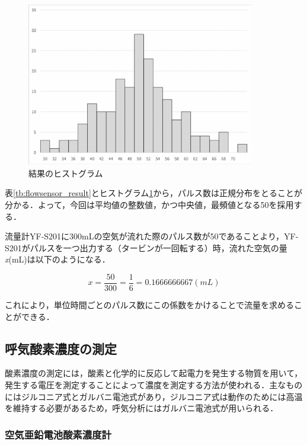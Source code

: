 \begin{figure}[H]
  \begin{center}
    \caption{結果のヒストグラム}
    \label{fig:flowsensor_histogram}
    \includegraphics[width=10cm]{fig/flowsensor_histogram}
  \end{center}
\end{figure}

表\ref{tb:flowsensor_result}とヒストグラム\ref{fig:flowsensor_histogram}から，パルス数は正規分布をとることが分かる．よって，今回は平均値の整数値，かつ中央値，最頻値となる50を採用する．

流量計YF-S201に300mLの空気が流れた際のパルス数が50であることより，YF-S201がパルスを一つ出力する（タービンが一回転する）時，流れた空気の量{\it x}(mL)は以下のようになる．

\begin{equation}
  \label{eq:pulse_per_ml}
  x = \frac{50}{300} = \frac{1}{6} = 0.1666666667 (mL)
\end{equation}

これにより，単位時間ごとのパルス数にこの係数をかけることで流量を求めることができる．

\subsection{呼気酸素濃度の測定}

酸素濃度の測定には，酸素と化学的に反応して起電力を発生する物質を用いて，発生する電圧を測定することによって濃度を測定する方法が使われる．主なものにはジルコニア式とガルバニ電池式があり，ジルコニア式は動作のためには高温を維持する必要があるため，呼気分析にはガルバニ電池式が用いられる．

\subsubsection{空気亜鉛電池酸素濃度計}
\label{sec:o2sensor_a-5s}

